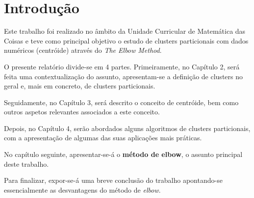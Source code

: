\documentclass[12pt, a4paper, oneside]{scrreport}
\begin{document}
\setlength{\leftmargini}{-0,35cm}
\setlength{\leftmarginii}{-0,35cm}

\renewcommand*\contentsname{Índice}
\tableofcontents

\renewcommand{\listfigurename}{Lista de Figuras}
\listoffigures

\renewcommand{\listtablename}{Tabelas}


\newpage


\renewcommand{\chaptermark}[1]{\markboth{#1}{}}
\ofoot*{\color{gray} \leftmark\hspace{0.25cm}|\hspace{0.25cm}\thepage}


\chapter{Introdução}

Este trabalho foi realizado no âmbito da Unidade Curricular de Matemática das Coisas e teve como principal objetivo o estudo de clusters particionais com dados numéricos (centróide) através do  \textit{The Elbow Method}.\par
O presente relatório divide-se em 4 partes. Primeiramente, no Capítulo 2, será feita uma contextualização do assunto, apresentam-se a definição de clusters no geral e, mais em concreto, de clusters particionais.\par
Seguidamente, no Capítulo 3, será descrito o conceito de centróide, bem como outros aspetos relevantes associados a este conceito.\par
Depois, no Capítulo 4, serão abordados alguns algoritmos de clusters particionais, com a apresentação de algumas das suas aplicações mais práticas.\par
No capítulo seguinte, apresentar-se-á o \textbf{método de elbow}, o assunto principal deste trabalho.\par 
Para finalizar, expor-se-á uma breve conclusão do trabalho apontando-se essencialmente as desvantagens do método de \textit{elbow}.
\end{document}
